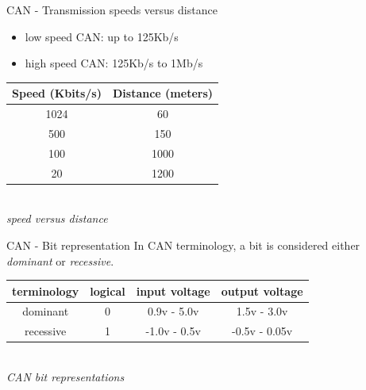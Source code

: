 \begin{frame}{CAN - Transmission speeds versus distance}
  \begin{itemize}
  \item low speed CAN: up to 125Kb/s
  \item high speed CAN: 125Kb/s to 1Mb/s
  \end{itemize}

  \smallskip

  \begin{center}
    \begin{tabular}{|c|c|}
      \hline
      \textbf{Speed} (Kbits/s) & \textbf{Distance} (meters) \\
      \hline
      1024 & 60 \\
      500 & 150 \\
      100 & 1000 \\
      20 & 1200 \\
      \hline
    \end{tabular}
    \smallskip
    \begin{tiny}
      \textit{\\speed versus distance}
    \end{tiny}
  \end{center}

\end{frame}

\begin{frame}{CAN - Bit representation}
  In CAN terminology, a bit is considered either \textit{dominant} or \textit{recessive}.

  \begin{center}
    \begin{tabular}{|c|c|c|c|}
      \hline
      \textbf{terminology} & \textbf{logical} & \textbf{input voltage} & \textbf{output voltage} \\
      \hline
      dominant & 0 & 0.9v - 5.0v & 1.5v - 3.0v \\
      \hline
      recessive & 1 & -1.0v - 0.5v & -0.5v - 0.05v \\
      \hline
    \end{tabular}
    \smallskip
    \begin{tiny}
      \textit{\\CAN bit representations}
    \end{tiny}
  \end{center}

\end{frame}

